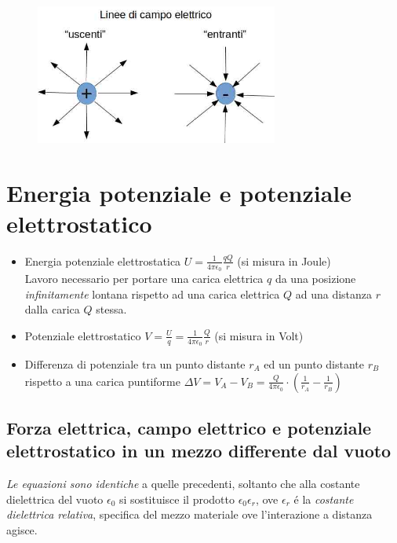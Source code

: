 \documentclass[17pt]{article}
\begin{document}
\begin{figure}[th]
\includegraphics[width=8cm]{lineeCampoElettrico.jpg}%
\centering
\end{figure}


\section{Energia potenziale e potenziale elettrostatico}



\begin{itemize}
	\item Energia potenziale elettrostatica $U = \frac{1}{4\pi\epsilon_0}\frac{qQ}{r}$ (si misura in Joule)\\
	Lavoro necessario per portare una carica elettrica $q$ da una posizione \emph{infinitamente} lontana rispetto ad una carica elettrica $Q$ ad una distanza $r$ dalla carica $Q$ stessa.
	\item Potenziale elettrostatico $V = \frac{U}{q}=\frac{1}{4\pi\epsilon_0}\frac{Q}{r}$ (si misura in Volt)
	\item Differenza di potenziale tra un punto distante $r_A$ ed un punto distante $r_B$ rispetto a una carica puntiforme $\Delta V = V_A - V_B = \frac{Q}{4\pi\epsilon_0}\cdot\left( \frac{1}{r_A} - \frac{1}{r_B} \right)$ 
\end{itemize}


\subsection{Forza elettrica, campo elettrico e potenziale elettrostatico in un mezzo differente dal vuoto}
\emph{Le equazioni sono identiche} a quelle precedenti, soltanto che alla costante dielettrica del vuoto $\epsilon_0$ si sostituisce il prodotto $\epsilon_0\epsilon_r$, ove $\epsilon_r$ \'e la \emph{costante dielettrica relativa}, specifica del mezzo materiale ove l'interazione a distanza agisce.
\end{document}
